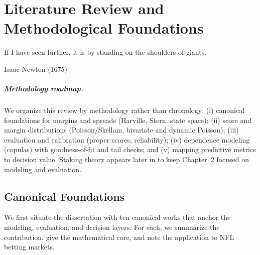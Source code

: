 \chapter{Literature Review and Methodological Foundations}
\label{chap:litreview}

\epigraph{If I have seen further, it is by standing on the shoulders of giants.}{Isaac Newton (1675)}


\paragraph{Methodology roadmap.} We organize this review by methodology rather than chronology: (i) canonical foundations for margins and spreads (Harville, Stern, state space); (ii) score and margin distributions (Poisson/Skellam, bivariate and dynamic Poisson); (iii) evaluation and calibration (proper scores, reliability); (iv) dependence modeling (copulas) with goodness‑of‑fit and tail checks; and (v) mapping predictive metrics to decision value. Staking theory appears later in  to keep Chapter~2 focused on modeling and evaluation.

\section{Canonical Foundations}
We first situate the dissertation with ten canonical works that anchor the modeling, evaluation, and decision layers. For each, we summarize the contribution, give the mathematical core, and note the application to NFL betting markets.

